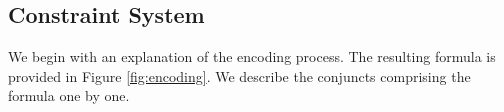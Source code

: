 





\subsection{Constraint System}

We begin with an explanation of the encoding process. The resulting formula is provided in Figure \ref{fig:encoding}. We describe the conjuncts comprising the formula one by one.

